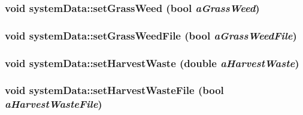 \label{classsystem_data_a5edc4dc1a1d3e695410c647221647076}
\hypertarget{classsystem_data_a8ed653bc146633d6ad3eeeeb47b74d9d}{
\subsubsection[{setGrassWeed}]{\setlength{\rightskip}{0pt plus 5cm}void systemData::setGrassWeed (bool {\em aGrassWeed})}}
\label{classsystem_data_a8ed653bc146633d6ad3eeeeb47b74d9d}
\hypertarget{classsystem_data_a1c5457167f62fa8ae058d401660b1562}{
\subsubsection[{setGrassWeedFile}]{\setlength{\rightskip}{0pt plus 5cm}void systemData::setGrassWeedFile (bool {\em aGrassWeedFile})}}
\label{classsystem_data_a1c5457167f62fa8ae058d401660b1562}
\hypertarget{classsystem_data_a6912320cc01f25c656d13e64c3c85407}{
\subsubsection[{setHarvestWaste}]{\setlength{\rightskip}{0pt plus 5cm}void systemData::setHarvestWaste (double {\em aHarvestWaste})}}
\label{classsystem_data_a6912320cc01f25c656d13e64c3c85407}
\hypertarget{classsystem_data_aa74aae964b4bcb4ed21fec88801ec725}{
\subsubsection[{setHarvestWasteFile}]{\setlength{\rightskip}{0pt plus 5cm}void systemData::setHarvestWasteFile (bool {\em aHarvestWasteFile})}}
\label{classsystem_data_aa74aae964b4bcb4ed21fec88801ec725}
